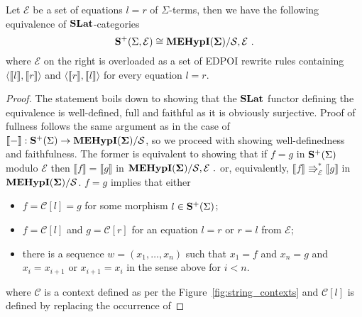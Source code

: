 \begin{theorem}
    \label{proof:appendix:soundness}
    Let $\mathcal{E}$ be a set of equations $l = r$ of $\Sigma$-terms, then we have the following equivalence of $\mathbf{SLat}$-categories
    \[
        \mathbf{S}^{+}(\Sigma, \mathcal {E} ) \cong {\mathbf{MEHypI(\Sigma)}} / \mathcal{S,E}~.
    \]
    where $\mathcal{E}$ on the right is overloaded as a set of EDPOI rewrite rules containing $\langle \llbracket l \rrbracket, \llbracket r \rrbracket  \rangle$ and $\langle \llbracket r \rrbracket, \llbracket l \rrbracket  \rangle$ for every equation $l = r$.
\end{theorem}
\begin{proof}
    The statement boils down to showing that the $\mathbf{SLat}$ functor defining the equivalence is well-defined, full and faithful as it is obviously surjective.
    Proof of fullness follows the same argument as in the case of $\llbracket - \rrbracket: \mathbf{S}^{+}(\Sigma) \to {\mathbf{MEHypI(\Sigma)}} / \mathcal{S}$, so we proceed with showing well-definedness and faithfulness.     
    The former is equivalent to showing that if $f = g$ in $\mathbf{S}^{+}(\Sigma)$ modulo $\mathcal{E}$ then $\llbracket f\rrbracket = \llbracket g \rrbracket$ in ${\mathbf{MEHypI(\Sigma)}} / \mathcal{S,E}~.$ or, equivalently, $\llbracket f \rrbracket \Rrightarrow_{\mathcal{E}}^{*} \llbracket g \rrbracket$ in ${\mathbf{MEHypI(\Sigma)}} / \mathcal{S}$.
    $f = g$ implies that either
    \begin{itemize}
        \item $f = \mathcal{C}[l] = g$ for some morphism $l \in \mathbf{S}^{+}(\Sigma)$;
        \item $f = \mathcal{C}[l]$ and $g = \mathcal{C}[r]$ for an equation $l = r$ or $r = l$ from $\mathcal{E}$;
        \item there is a sequence $w = (x_1, \ldots, x_n)$ such that $x_1 = f$ and $x_n = g$ and $x_i = x_{i+1}$ or $x_{i+1} = x_{i}$ in the sense above for $i < n$.
    \end{itemize}
    where $\mathcal{C}$ is a context defined as per the Figure~\ref{fig:string_contexts} and $\mathcal{C}[l]$ is defined by replacing the occurrence of
\end{proof}
